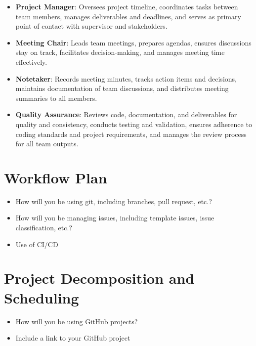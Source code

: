 \documentclass{article}
\begin{document}

\begin{itemize}
  \item \textbf{Project Manager}: Oversees project timeline, coordinates tasks between team members, manages deliverables and deadlines, and serves as primary point of contact with supervisor and stakeholders.
  \item \textbf{Meeting Chair}: Leads team meetings, prepares agendas, ensures discussions stay on track, facilitates decision-making, and manages meeting time effectively.
  \item \textbf{Notetaker}: Records meeting minutes, tracks action items and decisions, maintains documentation of team discussions, and distributes meeting summaries to all members.
  \item \textbf{Quality Assurance}: Reviews code, documentation, and deliverables for quality and consistency, conducts testing and validation, ensures adherence to coding standards and project requirements, and manages the review process for all team outputs.
\end{itemize}

\section{Workflow Plan}

\begin{itemize}
  \item How will you be using git, including branches, pull request, etc.?
  \item How will you be managing issues, including template issues, issue
        classification, etc.?
  \item Use of CI/CD
\end{itemize}

\section{Project Decomposition and Scheduling}

\begin{itemize}
  \item How will you be using GitHub projects?
  \item Include a link to your GitHub project
\end{itemize}
\end{document}
